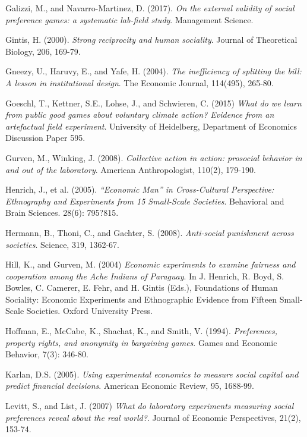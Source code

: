 \documentclass[12pt]{article}
\begin{document}
{\begin{thebibliography}{9}
Galizzi, M., and Navarro-Martinez, D. (2017).
\textit{On the external validity of social preference games: a systematic lab-field study}.
Management Science.

Gintis, H. (2000).
\textit{Strong reciprocity and human sociality}.
Journal of Theoretical Biology, 206, 169-79.

Gneezy, U., Haruvy, E., and Yafe, H. (2004).
\textit{The inefficiency of splitting the bill: A lesson in institutional design}.
The Economic Journal, 114(495), 265-80.

Goeschl, T., Kettner, S.E., Lohse, J., and Schwieren, C. (2015)
\textit{What do we learn from public good games about voluntary climate action? Evidence from an artefactual field experiment}.
University of Heidelberg, Department of Economics Discussion Paper 595.

Gurven, M., Winking, J. (2008).
\textit{Collective action in action: prosocial behavior in and out of the laboratory}.
American Anthropologist, 110(2), 179-190. 


Henrich, J., et al. (2005).
\textit{``Economic Man'' in Cross-Cultural Perspective: Ethnography and Experiments from 15 Small-Scale Societies}.
Behavioral and Brain Sciences. 28(6): 795?815.

Hermann, B., Thoni, C., and Gachter, S. (2008).
\textit{Anti-social punishment across societies}.
Science, 319, 1362-67.

Hill, K., and Gurven, M. (2004)
\textit{Economic experiments to examine fairness and cooperation among the Ache Indians of Paraguay}.
In J. Henrich, R. Boyd, S. Bowles, C. Camerer, E. Fehr, and H. Gintis (Eds.),
Foundations of Human Sociality: Economic Experiments and Ethnographic Evidence from Fifteen Small-Scale Societies. Oxford University Press.

Hoffman, E., McCabe, K., Shachat, K., and Smith, V. (1994).
\textit{Preferences, property rights, and anonymity in bargaining games}.
Games and Economic Behavior, 7(3): 346-80.

Karlan, D.S. (2005).
\textit{Using experimental economics to measure social capital and predict financial decisions}.
American Economic Review, 95, 1688-99.

Levitt, S., and List, J. (2007)
\textit{What do laboratory experiments measuring social preferences reveal about the real world?}.
Journal of Economic Perspectives, 21(2), 153-74.



\end{thebibliography}}
\end{document}
